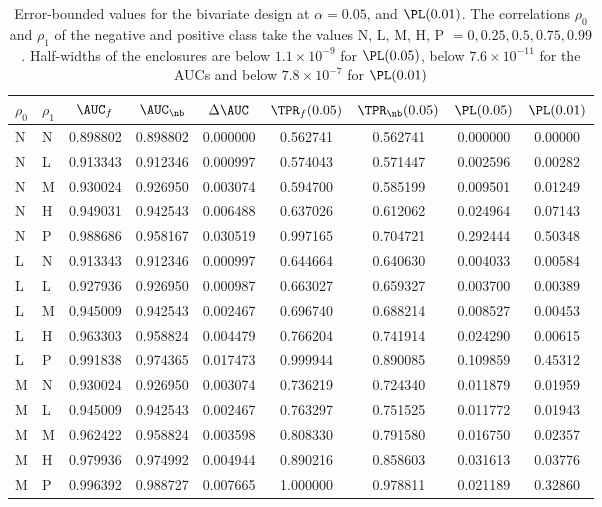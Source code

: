 \begin{table}[t]
\caption{Error-bounded values for the bivariate design at $\alpha=0.05$, and $\PL(0.01)$. The correlations $\rho_0$ and $\rho_1$ of the negative and positive class take the values N, L, M, H, P $=0, 0.25, 0.5, 0.75, 0.99$. Half-widths of the enclosures are below $1.1\times10^{-9}$ for $\PL(0.05)$, below $7.6\times10^{-11}$ for the AUCs and below $7.8\times10^{-7}$ for $\PL(0.01)$}\label{tab:biv}
\footnotesize
\begin{tabular*}{\textwidth}{@{\extracolsep\fill}llccccccc@{}}
\toprule
$\rho_0$ & $\rho_1$ & $\AUC_f$ & $\AUC_\nb$ & $\Delta\AUC$ & $\TPR_f(0.05)$ & $\TPR_\nb(0.05)$ & $\PL(0.05)$ & $\PL(0.01)$\\
\midrule
N & N & 0.898802 & 0.898802 & 0.000000 & 0.562741 & 0.562741 & 0.000000 & 0.00000\\
N & L & 0.913343 & 0.912346 & 0.000997 & 0.574043 & 0.571447 & 0.002596 & 0.00282\\
N & M & 0.930024 & 0.926950 & 0.003074 & 0.594700 & 0.585199 & 0.009501 & 0.01249\\
N & H & 0.949031 & 0.942543 & 0.006488 & 0.637026 & 0.612062 & 0.024964 & 0.07143\\
N & P & 0.988686 & 0.958167 & 0.030519 & 0.997165 & 0.704721 & 0.292444 & 0.50348\\
\midrule
L & N & 0.913343 & 0.912346 & 0.000997 & 0.644664 & 0.640630 & 0.004033 & 0.00584\\
L & L & 0.927936 & 0.926950 & 0.000987 & 0.663027 & 0.659327 & 0.003700 & 0.00389\\
L & M & 0.945009 & 0.942543 & 0.002467 & 0.696740 & 0.688214 & 0.008527 & 0.00453\\
L & H & 0.963303 & 0.958824 & 0.004479 & 0.766204 & 0.741914 & 0.024290 & 0.00615\\
L & P & 0.991838 & 0.974365 & 0.017473 & 0.999944 & 0.890085 & 0.109859 & 0.45312\\
\midrule
M & N & 0.930024 & 0.926950 & 0.003074 & 0.736219 & 0.724340 & 0.011879 & 0.01959\\
M & L & 0.945009 & 0.942543 & 0.002467 & 0.763297 & 0.751525 & 0.011772 & 0.01943\\
M & M & 0.962422 & 0.958824 & 0.003598 & 0.808330 & 0.791580 & 0.016750 & 0.02357\\
M & H & 0.979936 & 0.974992 & 0.004944 & 0.890216 & 0.858603 & 0.031613 & 0.03776\\
M & P & 0.996392 & 0.988727 & 0.007665 & 1.000000 & 0.978811 & 0.021189 & 0.32860\\

\end{tabular*}
\end{table}
